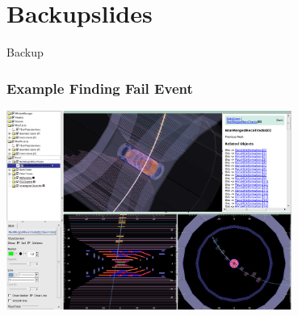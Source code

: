 \documentclass[18pt]{beamer}
\begin{document}
  \appendix
  \section{Backupslides}
  \backupbegin
  
  \begin{frame}
    \begin{center}
      \huge Backup
    \end{center}
  \end{frame}

    \begin{frame}
    \begin{center}
      \frametitle{Example Finding Fail Event}
      \includegraphics[width=0.7\textwidth]{figures/b2display_example_1trackevt.png}
    \end{center}
  \end{frame}
\end{document}
